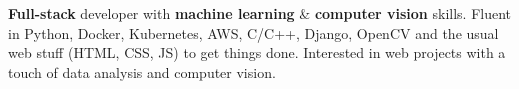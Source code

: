 

\begin{cvparagraph}
\textbf{Full-stack} developer with \textbf{machine learning} \& \textbf{computer vision} skills. Fluent in Python, Docker, Kubernetes, AWS, C/C++, Django, OpenCV and the usual web stuff (HTML, CSS, JS) to get things done. Interested in web projects with a touch of data analysis and computer vision.
\end{cvparagraph}
